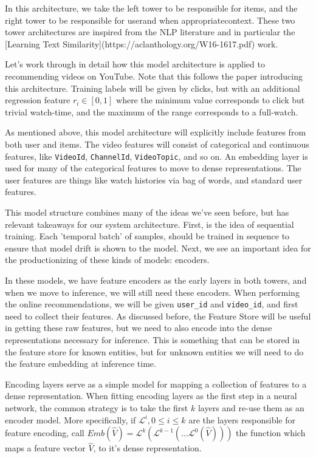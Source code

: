 In this architecture, we take the left tower to be responsible for items, and the right tower to be responsible for user\textemdash and when appropriate\textemdash context. These two tower architectures are inspired from the NLP literature and in particular the [Learning Text Similarity](https://aclanthology.org/W16-1617.pdf) work. 

Let's work through in detail how this model architecture is applied to recommending videos on YouTube. Note that this follows the paper introducing this architecture. Training labels will be given by clicks, but with an additional regression feature $r_i\in [0,1]$ where the minimum value corresponds to click but trivial watch-time, and the maximum of the range corresponds to a full-watch. 

As mentioned above, this model architecture will explicitly include features from both user and items. The video features will consist of categorical and continuous features, like \lstinline{VideoId}, \lstinline{ChannelId}, \lstinline{VideoTopic}, and so on. An embedding layer is used for many of the categorical features to move to dense representations. The user features are things like watch histories via bag of words, and standard user features.

This model structure combines many of the ideas we've seen before, but has relevant takeaways for our system architecture. First, is the idea of sequential training. Each 'temporal batch' of samples, should be trained in sequence to ensure that model drift is shown to the model. Next, we see an important idea for the productionizing of these kinds of models:  encoders.

In these models, we have feature encoders as the early layers in both towers, and when we move to inference, we will still need these encoders. When performing the online recommendations, we will be given \lstinline{user_id} and \lstinline{video_id}, and first need to collect their features. As discussed before, the Feature Store will be useful in getting these raw features, but we need to also encode into the dense representations necessary for inference. This is something that can be stored in the feature store for known entities, but for unknown entities we will need to do the feature embedding at inference time.

Encoding layers serve as a simple model for mapping a collection of features to a dense representation. When fitting encoding layers as the first step in a neural network, the common strategy is to take the first $k$ layers and re-use them as an encoder model. More specifically, if $\mathcal{L}^i, 0\leq i\leq k$ are the layers responsible for feature encoding, call $Emb(\hat{V})=\mathcal{L}^k(\mathcal{L}^{k-1}(\ldots\mathcal{L}^0(\hat{V})))$ the function which maps a feature vector $\hat{V}$, to it's dense representation.

